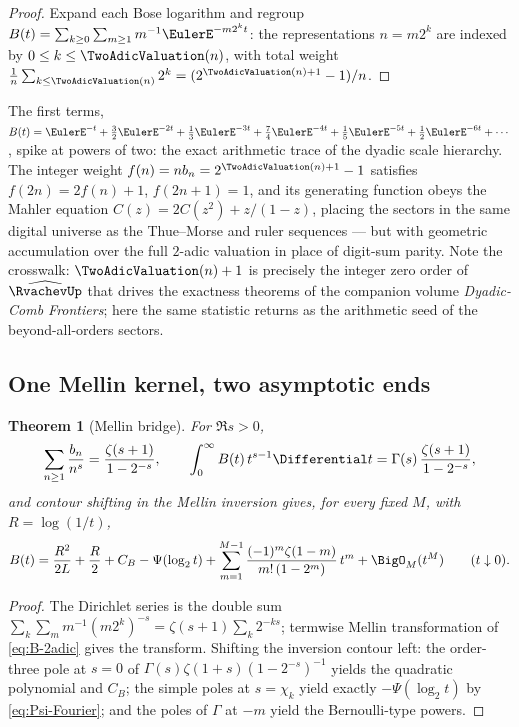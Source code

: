 \documentclass[11pt,oneside]{article}
\numberwithin{equation}{section}
\newtheorem{theorem}{Theorem}[section]
\theoremstyle{definition}
\theoremstyle{remark}
\newcommand{\CB}{C_{B}}
\begin{document}
\begin{proof}
Expand each Bose logarithm and regroup
$B(t)=\sum_{k\ge0}\sum_{m\ge1}m^{-1}\EulerE^{-m2^{k}t}$: the
representations $n=m2^{k}$ are indexed by $0\le k\le\TwoAdicValuation(n)$, with
total weight
$\tfrac1n\sum_{k\le\TwoAdicValuation(n)}2^{k}=(2^{\TwoAdicValuation(n)+1}-1)/n$.
\end{proof}

The first terms,
$B(t)=\EulerE^{-t}+\tfrac32\EulerE^{-2t}+\tfrac13\EulerE^{-3t}
+\tfrac74\EulerE^{-4t}+\tfrac15\EulerE^{-5t}+\tfrac12\EulerE^{-6t}+\cdots$, spike at
powers of two: the exact arithmetic trace of the dyadic scale
hierarchy.  The integer weight $f(n)=nb_n=2^{\TwoAdicValuation(n)+1}-1$
satisfies $f(2n)=2f(n)+1$, $f(2n+1)=1$, and its generating function
obeys the Mahler equation $C(z)=2C(z^{2})+z/(1-z)$, placing the
sectors in the same digital universe as the Thue--Morse and ruler
sequences --- but with geometric accumulation over the full
$2$-adic valuation in place of digit-sum parity.  Note the
crosswalk: $\TwoAdicValuation(n)+1$ is precisely the integer zero order of
$\widehat\RvachevUp$ that drives the exactness theorems of the companion
volume \emph{Dyadic-Comb Frontiers}; here the same statistic returns
as the arithmetic seed of the beyond-all-orders sectors.

\subsection{One Mellin kernel, two asymptotic ends}

\begin{theorem}[Mellin bridge]
\label{thm:mellin-bridge}
For $\Re s>0$,
\begin{equation}
 \sum_{n\ge1}\frac{b_n}{n^{s}}
 =\frac{\zeta(s+1)}{1-2^{-s}},
 \qquad
 \int_0^\infty B(t)\,t^{s-1}\Differential t
 =\Gamma(s)\,\frac{\zeta(s+1)}{1-2^{-s}},
 \label{eq:mellin}
\end{equation}
and contour shifting in the Mellin inversion gives, for every fixed
$M$, with $R=\log(1/t)$,
\begin{equation}
 B(t)=\frac{R^{2}}{2L}+\frac R2+\CB-\Psi(\log_2t)
 +\sum_{m=1}^{M-1}\frac{(-1)^{m}\zeta(1-m)}{m!\,(1-2^{m})}\,t^{m}
 +\BigO_M(t^{M})
 \qquad(t\downarrow0).
 \label{eq:B-small-t}
\end{equation}
\end{theorem}

\begin{proof}
The Dirichlet series is the double sum
$\sum_{k}\sum_{m}m^{-1}(m2^{k})^{-s}
=\zeta(s+1)\sum_k2^{-ks}$; termwise Mellin transformation of
\eqref{eq:B-2adic} gives the transform.  Shifting the inversion
contour left: the order-three pole at $s=0$ of
$\Gamma(s)\zeta(1+s)(1-2^{-s})^{-1}$ yields the quadratic polynomial
and $\CB$; the simple poles at $s=\chi_k$ yield exactly
$-\Psi(\log_2t)$ by \eqref{eq:Psi-Fourier}; and the poles of
$\Gamma$ at $-m$ yield the Bernoulli-type powers.
\end{proof}
\end{document}
